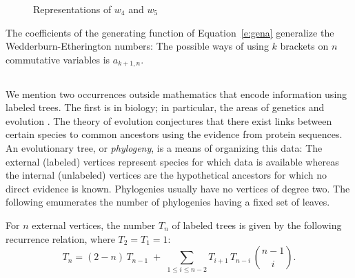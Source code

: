\documentclass[10pt]{amsart}
\begin{document}
            \begin{figure}[h]
            \caption{Representations of $w_4$ and $w_5$}
            \label{f:wedder}
            \end{figure}
            
            \begin{rem}
            The coefficients of the generating function of Equation~\ref{e:gena} generalize the Wedderburn-Etherington numbers:  The possible ways of using $k$ brackets on $n$ commutative variables is $a_{k+1, n}$.
            \end{rem}
            
            
            \subsection{}
            
            We mention two occurrences outside mathematics that encode information using labeled trees.  The first is in biology; in particular, the areas of genetics and evolution \cite{ph}.  The theory of evolution conjectures that there exist links between certain species to common ancestors using the evidence from protein sequences.  An evolutionary tree, or {\em phylogeny}, is a means of organizing this data: The external (labeled) vertices represent species for which data is available whereas the internal (unlabeled) vertices are the hypothetical ancestors for which no direct evidence is known.  Phylogenies usually have no vertices of degree two.  The following emumerates the number of phylogenies having a fixed set of leaves.
            
            \begin{prop} \textup{\cite[\S2]{fr}}
            For $n$ external vertices, the number $T_n$ of labeled trees is given by the following recurrence relation, where $T_2=T_1=1$:
            $$ T_n = (2-n) \, T_{n-1} \;+\; \sum_{1 \leq i \leq n-2} T_{i+1} \, T_{n-i} \, \binom{n-1}{i}.$$
            \end{prop}
            
\end{document}
